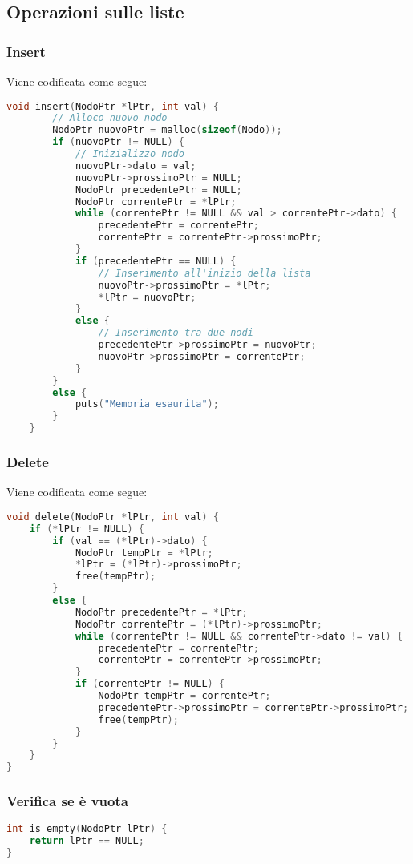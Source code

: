 \subsection{Operazioni sulle liste}
\subsubsection{Insert}
Viene codificata come segue:
\begin{lstlisting}[language=C, caption=Inserimento in una lista]
	void insert(NodoPtr *lPtr, int val) {
		// Alloco nuovo nodo
		NodoPtr nuovoPtr = malloc(sizeof(Nodo));
		if (nuovoPtr != NULL) {
			// Inizializzo nodo
			nuovoPtr->dato = val;
			nuovoPtr->prossimoPtr = NULL;
			NodoPtr precedentePtr = NULL;
			NodoPtr correntePtr = *lPtr;
			while (correntePtr != NULL && val > correntePtr->dato) {
				precedentePtr = correntePtr;
				correntePtr = correntePtr->prossimoPtr;
			}
			if (precedentePtr == NULL) {
				// Inserimento all'inizio della lista
				nuovoPtr->prossimoPtr = *lPtr;
				*lPtr = nuovoPtr;
			}
			else {
				// Inserimento tra due nodi
				precedentePtr->prossimoPtr = nuovoPtr;
				nuovoPtr->prossimoPtr = correntePtr;
			}
		}
		else {
			puts("Memoria esaurita");
		}
	}
\end{lstlisting}

\subsubsection{Delete}
Viene codificata come segue:
\begin{lstlisting}[language=C, caption=Cancellazione in una lista]
void delete(NodoPtr *lPtr, int val) {
	if (*lPtr != NULL) {
		if (val == (*lPtr)->dato) {
			NodoPtr tempPtr = *lPtr;
			*lPtr = (*lPtr)->prossimoPtr;
			free(tempPtr);
		}
		else {
			NodoPtr precedentePtr = *lPtr;
			NodoPtr correntePtr = (*lPtr)->prossimoPtr;
			while (correntePtr != NULL && correntePtr->dato != val) {
				precedentePtr = correntePtr;
				correntePtr = correntePtr->prossimoPtr;
			}
			if (correntePtr != NULL) {
				NodoPtr tempPtr = correntePtr;
				precedentePtr->prossimoPtr = correntePtr->prossimoPtr;
				free(tempPtr);
			}
		}
	}
}
\end{lstlisting}

\subsubsection{Verifica se è vuota}
\begin{lstlisting}[language=C, caption=Verificare se la lista è vuota]
int is_empty(NodoPtr lPtr) {
	return lPtr == NULL;
}
\end{lstlisting}


